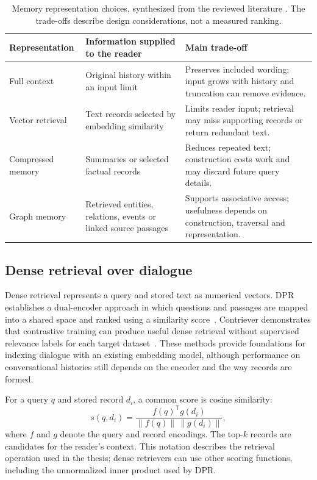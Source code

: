 \begin{table}[htbp]
  \centering
  \small
  \begin{tabular}{p{}p{}p{}}
    \toprule
    Representation & Information supplied to the reader & Main trade-off \\
    \midrule
    Full context & Original history within an input limit & Preserves included wording;
    input grows with history and truncation can remove evidence. \\
    Vector retrieval & Text records selected by embedding similarity & Limits reader input;
    retrieval may miss supporting records or return redundant text. \\
    Compressed memory & Summaries or selected factual records & Reduces repeated text;
    construction costs work and may discard future query details. \\
    Graph memory & Retrieved entities, relations, events or linked source passages & Supports
    associative access; usefulness depends on construction, traversal and representation. \\
    \bottomrule
  \end{tabular}
  \caption{Memory representation choices, synthesized from the reviewed literature
  \citep{memory_survey2024,rag_lewis,comedy,graph_memory_survey2026}. The trade-offs describe
  design considerations, not a measured ranking.}
  \label{tab:ch2_memory_representations}
\end{table}

\subsection{Dense retrieval over dialogue}

Dense retrieval represents a query and stored text as numerical vectors. DPR establishes
a dual-encoder approach in which questions and passages are mapped into a shared space
and ranked using a similarity score~\citep{dpr}. Contriever demonstrates that contrastive
training can produce useful dense retrieval without supervised relevance labels for each
target dataset~\citep{contriever}. These methods provide foundations for indexing dialogue
with an existing embedding model, although performance on conversational histories still
depends on the encoder and the way records are formed.

For a query $q$ and stored record $d_i$, a common score is cosine similarity:
\begin{equation}
  s(q,d_i)=\frac{f(q)^{\mathsf T}g(d_i)}{\lVert f(q)\rVert\,\lVert g(d_i)\rVert},
  \label{eq:ch2_similarity}
\end{equation}
where $f$ and $g$ denote the query and record encodings. The top-$k$ records are candidates
for the reader's context. This notation describes the retrieval operation used in the
thesis; dense retrievers can use other scoring functions, including the unnormalized
inner product used by DPR.

